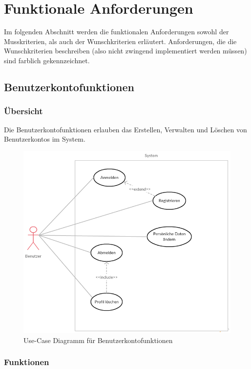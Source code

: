\documentclass[parskip=full]{scrartcl}
\begin{document}
\newpage

\section{Funktionale Anforderungen}
Im folgenden Abschnitt werden die funktionalen Anforderungen sowohl der Musskriterien, als auch der Wunschkriterien erläutert. Anforderungen, die die Wunschkriterien beschreiben (also nicht zwingend implementiert werden müssen) sind \colorbox{shadecolor}{farblich gekennzeichnet}.

\subsection{Benutzerkontofunktionen}

\subsubsection{Übersicht}
Die Benutzerkontofunktionen erlauben das Erstellen, Verwalten und Löschen von Benutzerkontos im System.

\begin{figure}[H]
	\centering
	\includegraphics[width=.7\textwidth]{Use_Cases/use_case_Benutzerprofil.png}
	\caption{Use-Case Diagramm für Benutzerkontofunktionen}	
\end{figure}

\subsubsection{Funktionen}
\end{document}
